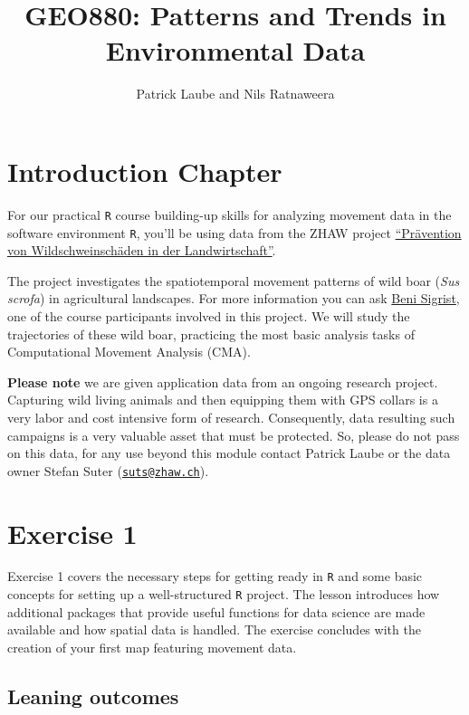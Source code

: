 \documentclass[]{book}
\title{GEO880: Patterns and Trends in Environmental Data}
\author{Patrick Laube and Nils Ratnaweera}
\date{}
\theoremstyle{definition}
\theoremstyle{definition}
\theoremstyle{definition}
\theoremstyle{remark}
\begin{document}
\maketitle

{
\setcounter{tocdepth}{1}
\tableofcontents
}
\chapter*{Introduction Chapter}\label{introduction-chapter}

For our practical \texttt{R} course building-up skills for analyzing
movement data in the software environment \texttt{R}, you'll be using
data from the ZHAW project
\href{https://www.zhaw.ch/de/lsfm/institute-zentren/iunr/integrative-oekologie/wildtiermanagement/referenzprojekte/}{``Prävention
von Wildschweinschäden in der Landwirtschaft''}.

The project investigates the spatiotemporal movement patterns of wild
boar (\emph{Sus scrofa}) in agricultural landscapes. For more
information you can ask
\href{https://www.zhaw.ch/de/ueber-uns/person/sigb/}{Beni Sigrist}, one
of the course participants involved in this project. We will study the
trajectories of these wild boar, practicing the most basic analysis
tasks of Computational Movement Analysis (CMA).

\textbf{Please note} we are given application data from an ongoing
research project. Capturing wild living animals and then equipping them
with GPS collars is a very labor and cost intensive form of research.
Consequently, data resulting such campaigns is a very valuable asset
that must be protected. So, please do not pass on this data, for any use
beyond this module contact Patrick Laube or the data owner Stefan Suter
(\href{mailto:suts@zhaw.ch}{\nolinkurl{suts@zhaw.ch}}).

\chapter{Exercise 1}\label{exercise-1}

Exercise 1 covers the necessary steps for getting ready in \texttt{R}
and some basic concepts for setting up a well-structured \texttt{R}
project. The lesson introduces how additional packages that provide
useful functions for data science are made available and how spatial
data is handled. The exercise concludes with the creation of your first
map featuring movement data.

\section{Leaning outcomes}\label{leaning-outcomes}
\end{document}
